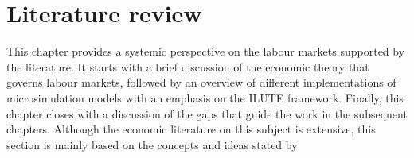 \chapter{Literature review}

This chapter provides a systemic perspective on the labour 
markets supported by the literature. It starts with a brief 
discussion of the economic theory that governs labour markets, 
followed by an overview of different implementations of 
microsimulation models with an emphasis on the ILUTE framework. 
Finally, this chapter closes with a discussion of the gaps 
that guide the work in the subsequent chapters. Although the 
economic literature on this subject is extensive, this section 
is mainly based on the concepts and ideas stated 
by 
